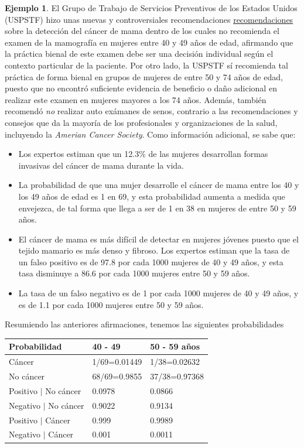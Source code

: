 \documentclass[
  10pt,
  spanish,
]{book}
\providecommand{\tightlist}{%
  \setlength{\itemsep}{0pt}\setlength{\parskip}{0pt}}
\theoremstyle{definition}
\theoremstyle{definition}
\newtheorem{example}{Ejemplo}[chapter]
\theoremstyle{definition}
\theoremstyle{definition}
\theoremstyle{remark}
\begin{document}
\begin{example}
\protect\hypertarget{exm:unnamed-chunk-12}{}{\label{exm:unnamed-chunk-12} }El Grupo de Trabajo de Servicios Preventivos de los Estados Unidos (USPSTF) hizo unas nuevas y controversiales recomendaciones \href{https://www.uspreventiveservicestaskforce.org/uspstf/recommendation/breast-cancer-screening}{recomendaciones} sobre la detección del cáncer de mama dentro de los cuales no recomienda el examen de la mamografía en mujeres entre 40 y 49 años de edad, afirmando que la práctica bienal de este examen debe ser una decisión individual según el contexto particular de la paciente. Por otro lado, la USPSTF sí recomienda tal práctica de forma bienal en grupos de mujeres de entre 50 y 74 años de edad, puesto que no encontró suficiente evidencia de beneficio o daño adicional en realizar este examen en mujeres mayores a los 74 años. Además, también recomendó \emph{no} realizar auto exámanes de senos, contrario a las recomendaciones y consejos que da la mayoría de los profesionales y organizaciones de la salud, incluyendo la \emph{Amerian Cancer Society}. Como información adicional, se sabe que:

\begin{itemize}
\tightlist
\item
  Los expertos estiman que un 12.3\% de las mujeres desarrollan formas invasivas del cáncer de mama durante la vida.
\item
  La probabilidad de que una mujer desarrolle el cáncer de mama entre los 40 y los 49 años de edad es 1 en 69, y esta probabilidad aumenta a medida que envejezca, de tal forma que llega a ser de 1 en 38 en mujeres de entre 50 y 59 años.
\item
  El cáncer de mama es más difícil de detectar en mujeres jóvenes puesto que el tejido mamario es más denso y fibroso. Los expertos estiman que la tasa de un falso positivo es de 97.8 por cada 1000 mujeres de 40 y 49 años, y esta tasa disminuye a 86.6 por cada 1000 mujeres entre 50 y 59 años.
\item
  La tasa de un falso negativo es de 1 por cada 1000 mujeres de 40 y 49 años, y es de 1.1 por cada 1000 mujeres entre 50 y 59 años.
\end{itemize}

Resumiendo las anteriores afirmaciones, tenemos las siguientes probabilidades

\begin{longtable}[]{@{}lll@{}}
\toprule
Probabilidad & 40 - 49 & 50 - 59 años \\
\midrule
\endhead
Cáncer & 1/69=0.01449 & 1/38=0.02632 \\
No cáncer & 68/69=0.9855 & 37/38=0.97368 \\
Positivo \(\mid\) No cáncer & 0.0978 & 0.0866 \\
Negativo \(\mid\) No cáncer & 0.9022 & 0.9134 \\
Positivo \(\mid\) Cáncer & 0.999 & 0.9989 \\
Negativo \(\mid\) Cáncer & 0.001 & 0.0011 \\
\bottomrule
\end{longtable}


\end{example}
\end{document}
